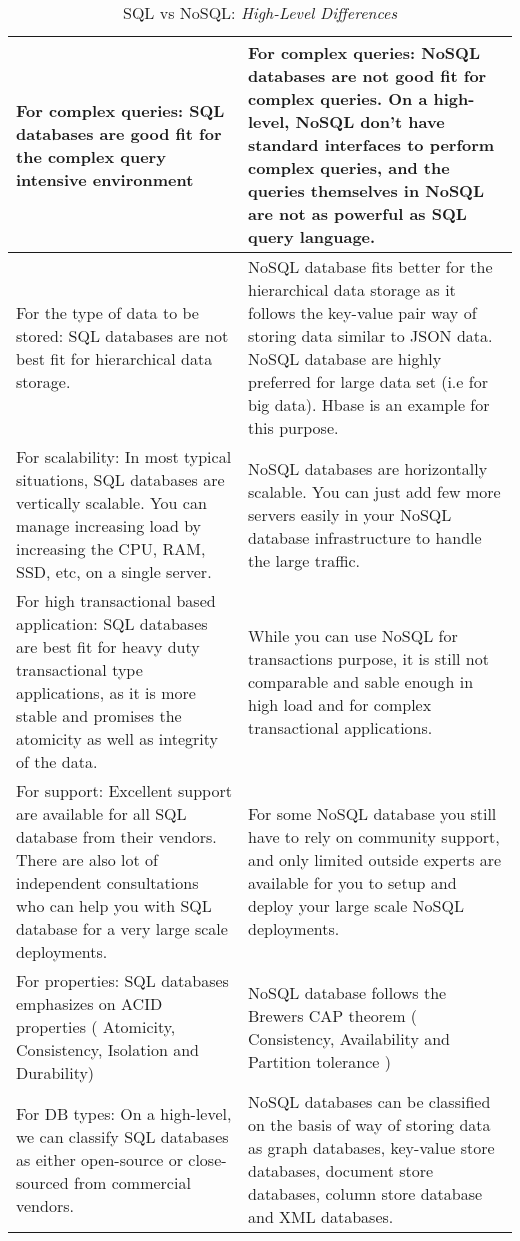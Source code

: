 \begin{table}[h!]
\begin{tabular}{ |C{0.3\paperwidth}|C{0.3\paperwidth}| }
For complex queries: SQL databases are good fit for the complex query intensive environment &
For complex queries: NoSQL databases are not good fit for complex queries. On a high-level, NoSQL don’t have standard interfaces to perform complex queries, and the queries themselves in NoSQL are not as powerful as SQL query language. \\
\hline
For the type of data to be stored: SQL databases are not best fit for hierarchical data storage. &
NoSQL database fits better for the hierarchical data storage as it follows the key-value pair way of storing data similar to JSON data. NoSQL database are highly preferred for large data set (i.e for big data). Hbase is an example for this purpose. \\
\hline
For scalability: In most typical situations, SQL databases are vertically scalable. You can manage increasing load by increasing the CPU, RAM, SSD, etc, on a single server. &
NoSQL databases are horizontally scalable. You can just add few more servers easily in your NoSQL database infrastructure to handle the large traffic. \\
\hline
For high transactional based application: SQL databases are best fit for heavy duty transactional type applications, as it is more stable and promises the atomicity as well as integrity of the data. &
While you can use NoSQL for transactions purpose, it is still not comparable and sable enough in high load and for complex transactional applications. \\
\hline
For support: Excellent support are available for all SQL database from their vendors. There are also lot of independent consultations who can help you with SQL database for a very large scale deployments. &
For some NoSQL database you still have to rely on community support, and only limited outside experts are available for you to setup and deploy your large scale NoSQL deployments. \\
\hline
For properties: SQL databases emphasizes on ACID properties ( Atomicity, Consistency, Isolation and Durability) &
NoSQL database follows the Brewers CAP theorem ( Consistency, Availability and Partition tolerance ) \\
\hline
For DB types: On a high-level, we can classify SQL databases as either open-source or close-sourced from commercial vendors. &  NoSQL databases can be classified on the basis of way of storing data as graph databases, key-value store databases, document store databases, column store database and XML databases. \\
\hline
\end{tabular}
    \caption{SQL vs NoSQL: \textit{High-Level Differences}}
    \label{tab:wide_table}
\end{table}



